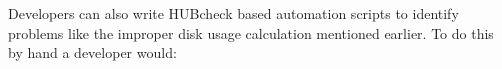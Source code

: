 

Developers can also write HUBcheck based automation scripts to identify
problems like the improper disk usage calculation mentioned earlier. To do this
by hand a developer would:

